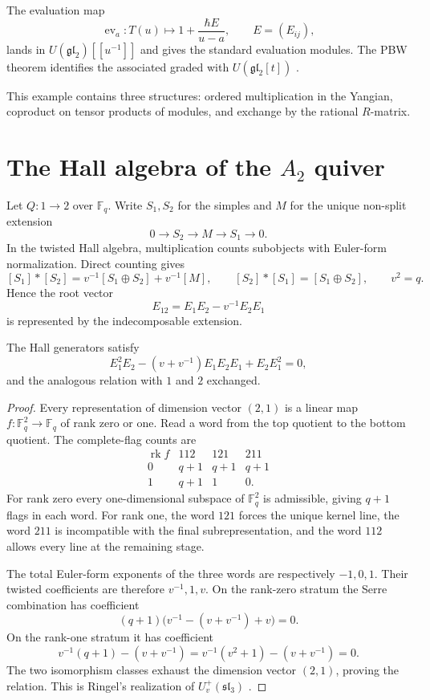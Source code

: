 The evaluation map
\[
 \operatorname{ev}_a:T(u)\longmapsto 1+\frac{\hbar E}{u-a},
 \qquad E=(E_{ij}),
\]
lands in $U(\mathfrak{gl}_2)[[u^{-1}]]$ and gives the standard evaluation modules. The PBW theorem identifies the associated graded with $U(\mathfrak{gl}_2[t])$ \cite{Molev,DrinfeldYangian}.

This example contains three structures: ordered multiplication in the Yangian, coproduct on tensor products of modules, and exchange by the rational $R$-matrix.

\chapter{The Hall algebra of the \texorpdfstring{$A_2$}{A2} quiver}
Let $Q:1\to2$ over $\mathbb F_q$. Write $S_1,S_2$ for the simples and $M$ for the unique non-split extension
\[
 0\to S_2\to M\to S_1\to0.
\]
In the twisted Hall algebra, multiplication counts subobjects with Euler-form normalization. Direct counting gives
\[
 [S_1]*[S_2]=v^{-1}[S_1\oplus S_2]+v^{-1}[M],
 \qquad
 [S_2]*[S_1]=[S_1\oplus S_2],
 \qquad v^2=q.
\]
Hence the root vector
\[
 E_{12}=E_1E_2-v^{-1}E_2E_1
\]
is represented by the indecomposable extension.

\begin{theorem}
The Hall generators satisfy
\[
 E_1^2E_2-(v+v^{-1})E_1E_2E_1+E_2E_1^2=0,
\]
and the analogous relation with $1$ and $2$ exchanged.
\end{theorem}
\begin{proof}
Every representation of dimension vector $(2,1)$ is a linear map $f:\mathbb F_q^2\to\mathbb F_q$ of rank zero or one. Read a word from the top quotient to the bottom quotient. The complete-flag counts are
\[
\begin{array}{c|ccc}
\operatorname{rk}f&112&121&211\\ \hline
0&q+1&q+1&q+1\\
1&q+1&1&0.
\end{array}
\]
For rank zero every one-dimensional subspace of $\mathbb F_q^2$ is admissible, giving $q+1$ flags in each word. For rank one, the word $121$ forces the unique kernel line, the word $211$ is incompatible with the final subrepresentation, and the word $112$ allows every line at the remaining stage.

The total Euler-form exponents of the three words are respectively $-1,0,1$. Their twisted coefficients are therefore $v^{-1},1,v$. On the rank-zero stratum the Serre combination has coefficient
\[
 (q+1)\bigl(v^{-1}-(v+v^{-1})+v\bigr)=0.
\]
On the rank-one stratum it has coefficient
\[
 v^{-1}(q+1)-(v+v^{-1})
 =v^{-1}(v^2+1)-(v+v^{-1})=0.
\]
The two isomorphism classes exhaust the dimension vector $(2,1)$, proving the relation. This is Ringel's realization of $U_v^+(\mathfrak{sl}_3)$ \cite{Ringel,Green}.
\end{proof}

